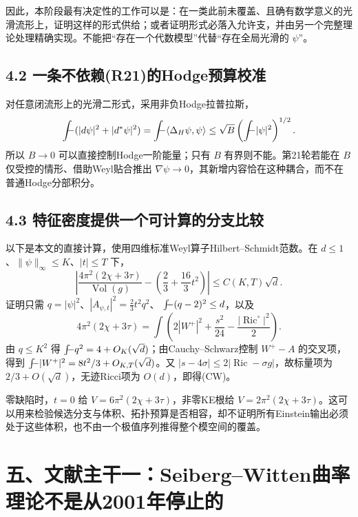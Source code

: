\documentclass[
  11pt,
  a4paper,
  fontset=none]{ctexart}
\newcommand{\avgint}{\mathchoice{\displaystyle\int\!\!\!\!-}{\textstyle\int\!\!\!-}{\scriptstyle\int\!\!\!-}{\scriptscriptstyle\int\!\!\!-}}
\begin{document}
因此，本阶段最有决定性的工作可以是：在一类此前未覆盖、且确有数学意义的光滑流形上，证明这样的形式供给；或者证明形式必落入允许支，并由另一个完整理论处理精确实现。不能把``存在一个代数模型''代替``存在全局光滑的
\(\psi\)''。

\subsection{4.2
一条不依赖(R21)的Hodge预算校准}\label{ux4e00ux6761ux4e0dux4f9dux8d56r21ux7684hodgeux9884ux7b97ux6821ux51c6}

对任意闭流形上的光滑二形式，采用非负Hodge拉普拉斯， \[
\avgint(|d\psi|^2+|d^*\psi|^2)
=\avgint\langle\Delta_H\psi,\psi\rangle
\le \sqrt B\left(\avgint|\psi|^2\right)^{1/2}.
\] 所以 \(B\to0\) 可以直接控制Hodge一阶能量；只有 \(B\)
有界则不能。第21轮若能在 \(B\) 仅受控的情形、借助Weyl贴合推出
\(\nabla\psi\to0\)，其新增内容恰在这种耦合，而不在普通Hodge分部积分。

\subsection{4.3
特征密度提供一个可计算的分支比较}\label{ux7279ux5f81ux5bc6ux5ea6ux63d0ux4f9bux4e00ux4e2aux53efux8ba1ux7b97ux7684ux5206ux652fux6bd4ux8f83}

以下是本文的直接计算，使用四维标准Weyl算子Hilbert--Schmidt范数。在
\(d\le1\)、\(\|\psi\|_\infty\le K\)、\(|t|\le T\) 下， \[
\left|\frac{4\pi^2(2\chi+3\tau)}{\operatorname{Vol}(g)}
-\left(\frac23+\frac{16}{3}t^2\right)\right|
\le C(K,T)\sqrt d.
\tag{CW}
\] 证明只需 \(q=|\psi|^2\)、\(|A_{\psi,t}|^2=\frac23t^2q^2\)、
\(\avgint(q-2)^2\le d\)，以及 \[
4\pi^2(2\chi+3\tau)=
\int\left(2|W^+|^2+\frac{s^2}{24}-\frac{|\operatorname{Ric}^{\circ}|^2}{2}\right).
\] 由 \(q\le K^2\) 得
\(\avgint q^2=4+O_K(\sqrt d)\)；由Cauchy--Schwarz控制 \(W^+-A\)
的交叉项，得到 \(\avgint|W^+|^2=8t^2/3+O_{K,T}(\sqrt d)\)。又
\(|s-4\sigma|\le2|\operatorname{Ric}-\sigma g|\)，故标量项为
\(2/3+O(\sqrt d)\)，无迹Ricci项为 \(O(d)\)，即得(CW)。

零缺陷时，\(t=0\) 给 \(V=6\pi^2(2\chi+3\tau)\)，非零KE根给
\(V=2\pi^2(2\chi+3\tau)\)。这可以用来检验候选分支与体积、拓扑预算是否相容，却不证明所有Einstein输出必须处于这些体积，也不由一个极值序列推得整个模空间的覆盖。

\section{五、文献主干一：Seiberg--Witten曲率理论不是从2001年停止的}\label{ux4e94ux6587ux732eux4e3bux5e72ux4e00seibergwittenux66f2ux7387ux7406ux8bbaux4e0dux662fux4ece2001ux5e74ux505cux6b62ux7684}
\end{document}
